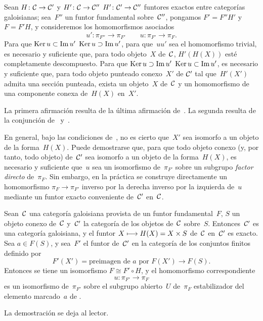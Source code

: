 \begin{proposition}
\label{V.6.11}
Sean $H\colon\cal C\to\cal C'$ y
{$H'\colon\cal C\to\cal C''$}
{$H'\colon\cal C'\to\cal C''$}
funtores exactos entre categorías galoisianas; sea~$F''$ un funtor
fundamental sobre~$\cal C''$, pongamos $F'=F''H'$ y $F=F'H$, y consideremos
los homomorfismos asociados
$$
u'\colon\pi_{F''}\to\pi_{F'}\qquad
u\colon\pi_{F'}\to\pi_F.
$$
Para que
{$\Ker u\subset\Im u'$}
{$\Ker u\supset\Im u'$},
\ie para que~$uu'$ sea el homomorfismo trivial, es necesario y suficiente
que, para todo objeto~$X$ de~$\cal C$, $H'(H(X))$ esté completamente
descompuesto. Para que
{$\Ker u\supset\Im u'$}
{$\Ker u\subset\Im u'$},
es necesario y suficiente que, para todo objeto punteado conexo~$X'$ de
$\cal C'$ tal que~$H'(X')$ admita una sección punteada, exista un objeto~$X$
de~$\cal C$ y un homomorfismo de una componente conexa de~$H(X)$ en~$X'$.
\end{proposition}

La primera afirmación resulta de la última afirmación de~. La
segunda resulta de la conjunción de~ y~.

\begin{remarque}
\label{V.6.12}
En general, bajo las condiciones de~, no es cierto que~$X'$ sea
isomorfo a un objeto de la forma~$H(X)$. Puede demostrarse que, para que
todo objeto conexo (y, por tanto, todo objeto) de~$\cal C'$ sea isomorfo a
un objeto de la forma~$H(X)$, es necesario y suficiente que~$u$ sea un
isomorfismo de~$\pi_{F'}$ sobre un subgrupo \emph{factor directo}
de~$\pi_F$. Sin embargo, en la práctica se construye directamente un
homomorfismo $\pi_F\to\pi_{F'}$
{inverso por la derecha}
{inverso por la izquierda}
de~$u$ mediante un funtor exacto conveniente de~$\cal C'$ en~$\cal C$.
\end{remarque}

\begin{proposition}
\label{V.6.13}
Sean~$\cal C$ una categoría galoisiana provista de un funtor fundamental~$F$,
$S$ un objeto conexo de~$\cal C$ y~$\cal C'$ la categoría de los objetos
de~$\cal C$ sobre~$S$. Entonces~$\cal C'$ es una categoría galoisiana, y el
funtor $X\mto H(X)=X\times S$ de~$\cal C$ en~$\cal C'$ es exacto. Sea
$a\in F(S)$, y sea~$F'$ el funtor de~$\cal C'$ en la categoría de los
conjuntos finitos definido por
$$
F'(X')=\text{preimagen de~$a$ por }F(X')\to F(S).
$$
Entonces se tiene un isomorfismo $F\cong F'\circ H$, y el homomorfismo
correspondiente
$$
u\colon\pi_{F'}\to\pi_F
$$
%
es un isomorfismo de~$\pi_{F'}$ sobre el subgrupo abierto~$U$ de~$\pi_F$
estabilizador del elemento marcado~$a$ de
.
\end{proposition}

La demostración se deja al lector.
